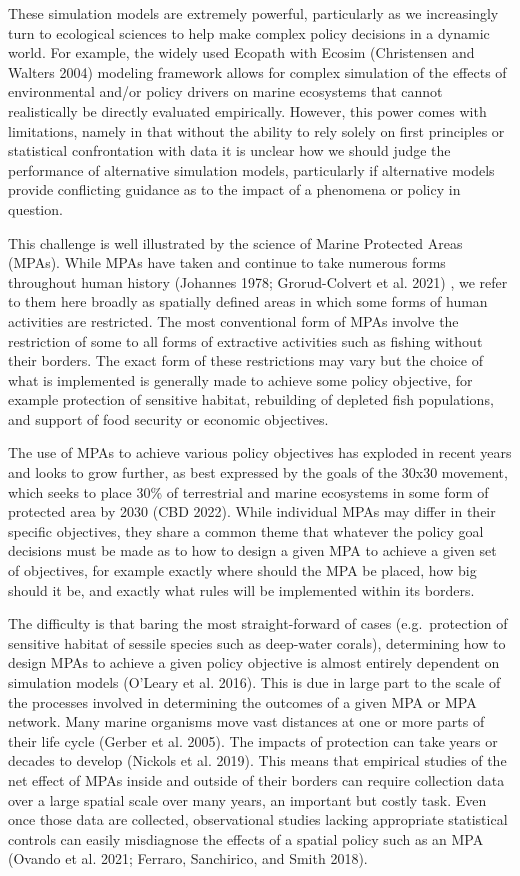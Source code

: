 \documentclass[
  default,
  lineno,
  referee]{sn-jnl}
\begin{document}
These simulation models are extremely powerful, particularly as we
increasingly turn to ecological sciences to help make complex policy
decisions in a dynamic world. For example, the widely used Ecopath with
Ecosim (Christensen and Walters 2004) modeling framework allows for
complex simulation of the effects of environmental and/or policy drivers
on marine ecosystems that cannot realistically be directly evaluated
empirically. However, this power comes with limitations, namely in that
without the ability to rely solely on first principles or statistical
confrontation with data it is unclear how we should judge the
performance of alternative simulation models, particularly if
alternative models provide conflicting guidance as to the impact of a
phenomena or policy in question.

This challenge is well illustrated by the science of Marine Protected
Areas (MPAs). While MPAs have taken and continue to take numerous forms
throughout human history (Johannes 1978; Grorud-Colvert et al. 2021) ,
we refer to them here broadly as spatially defined areas in which some
forms of human activities are restricted. The most conventional form of
MPAs involve the restriction of some to all forms of extractive
activities such as fishing without their borders. The exact form of
these restrictions may vary but the choice of what is implemented is
generally made to achieve some policy objective, for example protection
of sensitive habitat, rebuilding of depleted fish populations, and
support of food security or economic objectives.

The use of MPAs to achieve various policy objectives has exploded in
recent years and looks to grow further, as best expressed by the goals
of the 30x30 movement, which seeks to place 30\% of terrestrial and
marine ecosystems in some form of protected area by 2030 (CBD 2022).
While individual MPAs may differ in their specific objectives, they
share a common theme that whatever the policy goal decisions must be
made as to how to design a given MPA to achieve a given set of
objectives, for example exactly where should the MPA be placed, how big
should it be, and exactly what rules will be implemented within its
borders.

The difficulty is that baring the most straight-forward of cases
(e.g.~protection of sensitive habitat of sessile species such as
deep-water corals), determining how to design MPAs to achieve a given
policy objective is almost entirely dependent on simulation models
(O'Leary et al. 2016). This is due in large part to the scale of the
processes involved in determining the outcomes of a given MPA or MPA
network. Many marine organisms move vast distances at one or more parts
of their life cycle (Gerber et al. 2005). The impacts of protection can
take years or decades to develop (Nickols et al. 2019). This means that
empirical studies of the net effect of MPAs inside and outside of their
borders can require collection data over a large spatial scale over many
years, an important but costly task. Even once those data are collected,
observational studies lacking appropriate statistical controls can
easily misdiagnose the effects of a spatial policy such as an MPA
(Ovando et al. 2021; Ferraro, Sanchirico, and Smith 2018).
\end{document}
